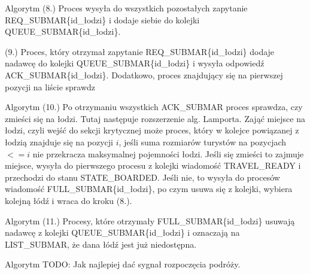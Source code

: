 \documentclass{beamer}
\begin{document}
\begin{frame}{Algorytm}
    \internallinenumbers
    (8.) Proces wysyła do wszystkich pozostałych zapytanie REQ\_SUBMAR\{id\_łodzi\} i dodaje siebie do kolejki QUEUE\_SUBMAR\{id\_łodzi\}.

    \vspace{0.5cm}
    (9.) Proces, który otrzymał zapytanie REQ\_SUBMAR\{id\_łodzi\} dodaje nadawcę do kolejki QUEUE\_SUBMAR\{id\_łodzi\} i wysyła odpowiedź ACK\_SUBMAR\{id\_łodzi\}.
    Dodatkowo, proces znajdujący się na pierwszej pozycji na liście sprawdz

\end{frame}


\begin{frame}{Algorytm}
    \internallinenumbers
    (10.) Po otrzymaniu wszystkich ACK\_SUBMAR proces sprawdza, czy zmieści się na łodzi. Tutaj następuje rozszerzenie alg. Lamporta. Zająć miejsce na łodzi, czyli wejść do sekcji krytycznej może proces, który w kolejce powiązanej z łodzią znajduje się na pozycji $i$, jeśli suma rozmiarów turystów na pozycjach $<= i$ nie przekracza maksymalnej pojemności łodzi. Jeśli się zmieści to zajmuje miejsce, wysyła do pierwszego procesu z kolejki wiadomość TRAVEL\_READY i przechodzi do stanu STATE\_BOARDED. Jeśli nie, to wysyła do procesów wiadomość FULL\_SUBMAR\{id\_łodzi\}, po czym usuwa się z kolejki, wybiera kolejną łódź i wraca do kroku (8.).
\end{frame}

\begin{frame}{Algorytm}
    \internallinenumbers
    (11.) Procesy, które otrzymały FULL\_SUBMAR\{id\_łodzi\} usuwają nadawcę z kolejki QUEUE\_SUBMAR\{id\_łodzi\} i oznaczają na LIST\_SUBMAR, że dana łódź jest już niedostępna. \\

\end{frame}

\begin{frame}{Algorytm}
    TODO: Jak najlepiej dać sygnał rozpoczęcia podróży.
\end{frame}
\end{document}

